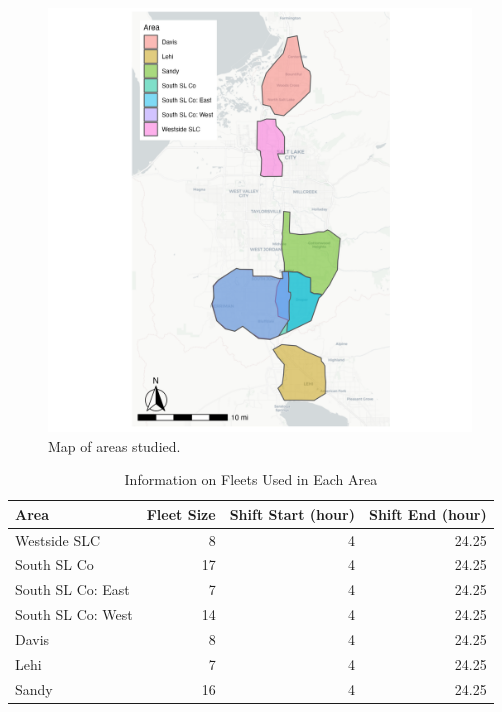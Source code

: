 \documentclass[
]{report}
\begin{document}
\begin{figure}
\includegraphics[width=29.17in]{image/areas_map} \caption{Map of areas studied.}\label{fig:zone-map}
\end{figure}

\begin{table}

\caption{\label{tab:zone-fleets}Information on Fleets Used in Each Area}
\centering
\begin{tabular}[t]{lrrr}
\toprule
Area & Fleet Size & Shift Start (hour) & Shift End (hour)\\
\midrule
Westside SLC & 8 & 4 & 24.25\\
South SL Co & 17 & 4 & 24.25\\
South SL Co: East & 7 & 4 & 24.25\\
South SL Co: West & 14 & 4 & 24.25\\
Davis & 8 & 4 & 24.25\\
Lehi & 7 & 4 & 24.25\\
Sandy & 16 & 4 & 24.25\\
\bottomrule
\end{tabular}
\end{table}
\end{document}
